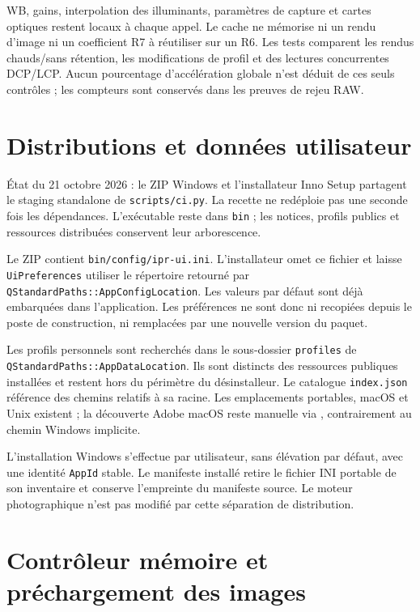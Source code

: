 WB, gains, interpolation des illuminants, paramètres de capture et cartes
optiques restent locaux à chaque appel. Le cache ne mémorise ni un rendu
d'image ni un coefficient R7 à réutiliser sur un R6. Les tests comparent les
rendus chauds/sans rétention, les modifications de profil et des lectures
concurrentes DCP/LCP. Aucun pourcentage d'accélération globale n'est déduit de
ces seuls contrôles ; les compteurs sont conservés dans les preuves de rejeu RAW.

\section{Distributions et données utilisateur}
\begingroup
{}

État du 21 octobre 2026 : le ZIP Windows et l'installateur Inno Setup partagent
le staging standalone de \texttt{scripts/ci.py}. La recette ne redéploie pas une
seconde fois les dépendances. L'exécutable reste dans \texttt{bin} ; les notices,
profils publics et ressources distribuées conservent leur arborescence.

Le ZIP contient \texttt{bin/config/ipr-ui.ini}. L'installateur omet ce fichier
et laisse \texttt{UiPreferences} utiliser le répertoire retourné par
\texttt{QStandardPaths::}\allowbreak\texttt{AppConfigLocation}. Les valeurs par défaut sont déjà
embarquées dans l'application. Les préférences ne sont donc ni recopiées depuis
le poste de construction, ni remplacées par une nouvelle version du paquet.

Les profils personnels sont recherchés dans le sous-dossier \texttt{profiles}
de \texttt{QStandardPaths::}\allowbreak\texttt{AppDataLocation}. Ils sont distincts des ressources
publiques installées et restent hors du périmètre du désinstalleur. Le catalogue
\texttt{index.json} référence des chemins relatifs à sa racine. Les emplacements
portables, macOS et Unix existent ; la découverte Adobe macOS reste manuelle via
, contrairement au chemin Windows implicite.

L'installation Windows s'effectue par utilisateur, sans élévation par défaut,
avec une identité \texttt{AppId} stable. Le manifeste installé retire le fichier
INI portable de son inventaire et conserve l'empreinte du manifeste source.
Le moteur photographique n'est pas modifié par cette séparation de distribution.
\endgroup

\section{Contrôleur mémoire et préchargement des images}

